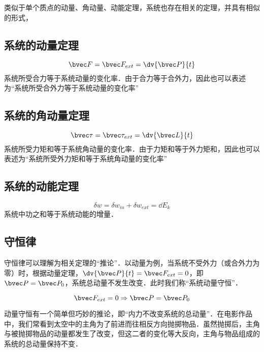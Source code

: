 类似于单个质点的动量、角动量、动能定理，系统也存在相关的定理，并具有相似的形式，

\subsection{系统的动量定理}
\begin{equation}
\bvec F = \bvec F_{ext} = \dv{\bvec P}{t}
\end{equation}
系统所受合力等于系统动量的变化率．由于合力等于合外力，因此也可以表述为“系统所受合外力等于系统动量的变化率”

\subsection{系统的角动量定理}
\begin{equation}
\bvec \tau = \bvec \tau_{ext} = \dv{\bvec L}{t}
\end{equation}
系统所受力矩和等于系统角动量的变化率．由于力矩和等于外力矩和，因此也可以表述为“系统所受外力矩和等于系统角动量的变化率”

\subsection{系统的动能定理}
\begin{equation}
\delta w =\delta w_{in} + \delta w_{ext} = \dd E_k
\end{equation}
系统中功之和等于系统动能的增量．

\subsection{守恒律}
守恒律可以理解为相关定理的“推论”．以动量为例，当系统不受外力（或合外力为零）时，根据动量定理，$\dv{\bvec P}{t} = \bvec F_{ext}=0$，即$\bvec P = \bvec P_0$，系统总动量不发生改变．此时我们称“系统动量守恒”．

\begin{equation}
\bvec F_{ext} = 0 \Rightarrow \bvec P = \bvec P_0
\end{equation}

动量守恒有一个简单但巧妙的推论，即“内力不改变系统的总动量”．在电影作品中，我们常看到太空中的主角为了前进而往相反方向抛掷物品．虽然抛掷后，主角与被抛掷物品的动量都发生了改变，但这二者的变化等大反向，主角与物品组成的系统的总动量保持不变．

